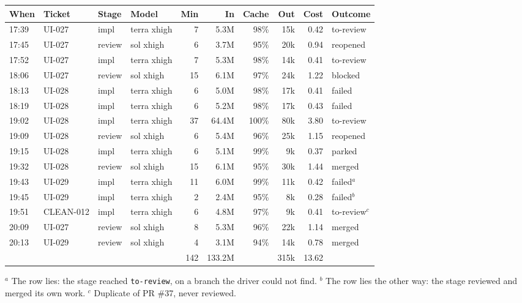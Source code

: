 \documentclass[11pt,a4paper]{article}
\begin{document}
{\small
\begin{tabularx}{\linewidth}{@{}llllrrrrrX@{}}
\toprule
When & Ticket & Stage & Model & Min & In & Cache & Out & Cost & Outcome \\
\midrule
17:39 & UI-027 & impl & terra xhigh & 7 & 5.3M & 98\% & 15k & 0.42 & to-review \\
17:45 & UI-027 & review & sol xhigh & 6 & 3.7M & 95\% & 20k & 0.94 & reopened \\
17:52 & UI-027 & impl & terra xhigh & 7 & 5.3M & 98\% & 14k & 0.41 & to-review \\
18:06 & UI-027 & review & sol xhigh & 15 & 6.1M & 97\% & 24k & 1.22 & blocked \\
18:13 & UI-028 & impl & terra xhigh & 6 & 5.0M & 98\% & 17k & 0.41 & failed \\
18:19 & UI-028 & impl & terra xhigh & 6 & 5.2M & 98\% & 17k & 0.43 & failed \\
19:02 & UI-028 & impl & terra xhigh & 37 & 64.4M & 100\% & 80k & 3.80 & to-review \\
19:09 & UI-028 & review & sol xhigh & 6 & 5.4M & 96\% & 25k & 1.15 & reopened \\
19:15 & UI-028 & impl & terra xhigh & 6 & 5.1M & 99\% & 9k & 0.37 & parked \\
19:32 & UI-028 & review & sol xhigh & 15 & 6.1M & 95\% & 30k & 1.44 & merged \\
19:43 & UI-029 & impl & terra xhigh & 11 & 6.0M & 99\% & 11k & 0.42 & failed$^a$ \\
19:45 & UI-029 & impl & terra xhigh & 2 & 2.4M & 95\% & 8k & 0.28 & failed$^b$ \\
19:51 & CLEAN-012 & impl & terra xhigh & 6 & 4.8M & 97\% & 9k & 0.41 & to-review$^c$ \\
20:09 & UI-027 & review & sol xhigh & 8 & 5.3M & 96\% & 22k & 1.14 & merged \\
20:13 & UI-029 & review & sol xhigh & 4 & 3.1M & 94\% & 14k & 0.78 & merged \\
\midrule
 & & & & 142 & 133.2M & & 315k & 13.62 & \\
\bottomrule
\end{tabularx}
}

{\footnotesize $^a$ The row lies: the stage reached \texttt{to-review}, on a branch the driver could
not find. $^b$ The row lies the other way: the stage reviewed and merged its own work.
$^c$ Duplicate of PR \#37, never reviewed.\par}
\end{document}
